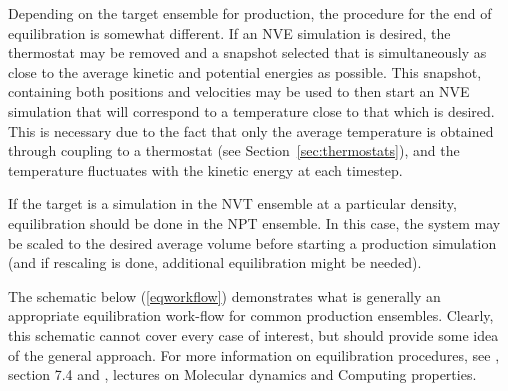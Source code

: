 \documentclass[9pt,bestpractices]{livecoms}
\begin{document}
Depending on the target ensemble for production, the procedure for the end of equilibration is somewhat different.
If an NVE simulation is desired, the thermostat may be removed and a snapshot selected that is simultaneously as close to the average kinetic and potential energies as possible.
This snapshot, containing both positions and velocities may be used to then start an NVE simulation that will correspond to a temperature close to that which is desired.
This is necessary due to the fact that only the average temperature is obtained through coupling to a thermostat (see Section~\ref{sec:thermostats}), and the temperature fluctuates with the kinetic energy at each timestep.

If the target is a simulation in the NVT ensemble at a particular density, equilibration should be done in the NPT ensemble.
In this case, the system may be scaled to the desired average volume before starting a production simulation (and if rescaling is done, additional equilibration might be needed).

The schematic below (\ref{eqworkflow}) demonstrates what is generally an appropriate equilibration work-flow for common production ensembles.
Clearly, this schematic cannot cover every case of interest, but should provide some idea of the general approach.
For more information on equilibration procedures, see \citet{LeachBook}, section 7.4 and \citet{ShellNotes}, lectures on Molecular dynamics and Computing properties.
\end{document}
